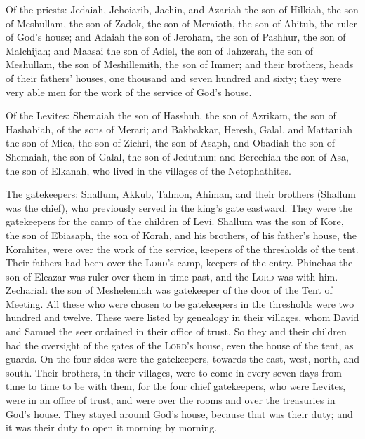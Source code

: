  Of the priests: Jedaiah, Jehoiarib, Jachin,
 and Azariah the son of Hilkiah, the son of Meshullam,
the son of Zadok, the son of Meraioth, the son of Ahitub, the ruler of
God's house;  and Adaiah the son of Jeroham, the son of
Pashhur, the son of Malchijah; and Maasai the son of Adiel, the son of
Jahzerah, the son of Meshullam, the son of Meshillemith, the son of
Immer;  and their brothers, heads of their fathers'
houses, one thousand and seven hundred and sixty; they were very able
men for the work of the service of God's house.

 Of the Levites: Shemaiah the son of Hasshub, the son of
Azrikam, the son of Hashabiah, of the sons of Merari; 
and Bakbakkar, Heresh, Galal, and Mattaniah the son of Mica, the son of
Zichri, the son of Asaph,  and Obadiah the son of
Shemaiah, the son of Galal, the son of Jeduthun; and Berechiah the son
of Asa, the son of Elkanah, who lived in the villages of the
Netophathites.

 The gatekeepers: Shallum, Akkub, Talmon, Ahiman, and
their brothers (Shallum was the chief),  who previously
served in the king's gate eastward. They were the gatekeepers for the
camp of the children of Levi.  Shallum was the son of
Kore, the son of Ebiasaph, the son of Korah, and his brothers, of his
father's house, the Korahites, were over the work of the service,
keepers of the thresholds of the tent. Their fathers had been over the
\textsc{Lord}'s camp, keepers of the entry.  Phinehas the
son of Eleazar was ruler over them in time past, and the \textsc{Lord}
was with him.  Zechariah the son of Meshelemiah was
gatekeeper of the door of the Tent of Meeting.  All these
who were chosen to be gatekeepers in the thresholds were two hundred and
twelve. These were listed by genealogy in their villages, whom David and
Samuel the seer ordained in their office of trust.  So
they and their children had the oversight of the gates of the
\textsc{Lord}'s house, even the house of the tent, as guards.
 On the four sides were the gatekeepers, towards the
east, west, north, and south.  Their brothers, in their
villages, were to come in every seven days from time to time to be with
them,  for the four chief gatekeepers, who were Levites,
were in an office of trust, and were over the rooms and over the
treasuries in God's house.  They stayed around God's
house, because that was their duty; and it was their duty to open it
morning by morning.

